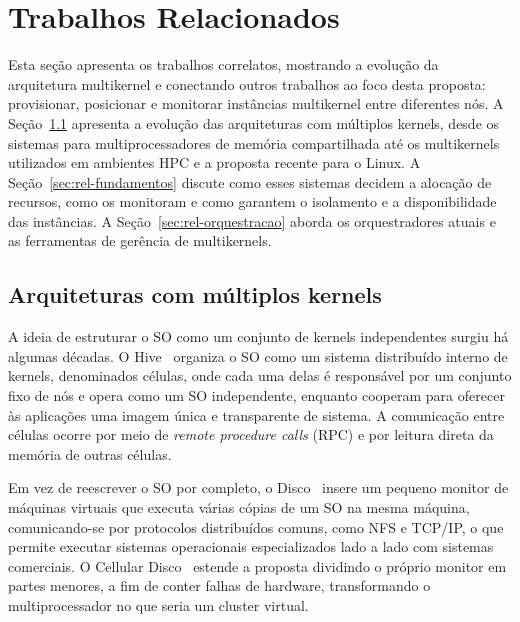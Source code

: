\documentclass[12pt]{article}
\begin{document}
\section{Trabalhos Relacionados} \label{sec:related}

Esta seção apresenta os trabalhos correlatos, mostrando a evolução da arquitetura multikernel e conectando outros
trabalhos ao foco desta proposta: provisionar, posicionar e monitorar instâncias multikernel entre diferentes nós.
A Seção~\ref{sec:rel-multikernel} apresenta a evolução das arquiteturas com múltiplos kernels, desde os sistemas para
multiprocessadores de memória compartilhada até os multikernels utilizados em ambientes HPC e a proposta recente para
o Linux. A Seção~\ref{sec:rel-fundamentos} discute como esses sistemas decidem a alocação de recursos, como os
monitoram e como garantem o isolamento e a disponibilidade das instâncias. A Seção~\ref{sec:rel-orquestracao} aborda
os orquestradores atuais e as ferramentas de gerência de multikernels.

\subsection{Arquiteturas com múltiplos kernels}
\label{sec:rel-multikernel}

A ideia de estruturar o SO como um conjunto de kernels independentes surgiu há algumas décadas.
O Hive~\cite{chapin1995hive} organiza o SO como um sistema distribuído interno de kernels, denominados células,
onde cada uma delas é responsável por um conjunto fixo de nós e opera como um SO independente, enquanto cooperam
para oferecer às aplicações uma imagem única e transparente de sistema.
A comunicação entre células ocorre por meio de \textit{remote procedure calls} (RPC) e por leitura direta da memória de outras células.

Em vez de reescrever o SO por completo, o Disco~\cite{bugnion1997disco} insere um pequeno monitor de máquinas virtuais
que executa várias cópias de um SO na mesma máquina, comunicando-se por protocolos distribuídos comuns, como NFS e
TCP/IP, o que permite executar sistemas operacionais especializados lado a lado com sistemas comerciais.
O Cellular Disco~\cite{govil2000cellular} estende a proposta dividindo o próprio monitor em partes menores, a fim de
conter falhas de hardware, transformando o multiprocessador no que seria um cluster virtual.
\end{document}
